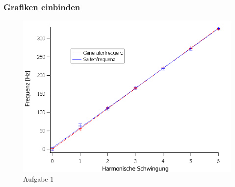 \documentclass{beamer}
\begin{document}
\begin{frame}
\frametitle{Grafiken einbinden}
  \begin{figure}[htb]
    \includegraphics[height=0.7\textheight]{Aufgabe1.png}
    \caption{Aufgabe 1}
  \end{figure}
\end{frame}

\end{document}
